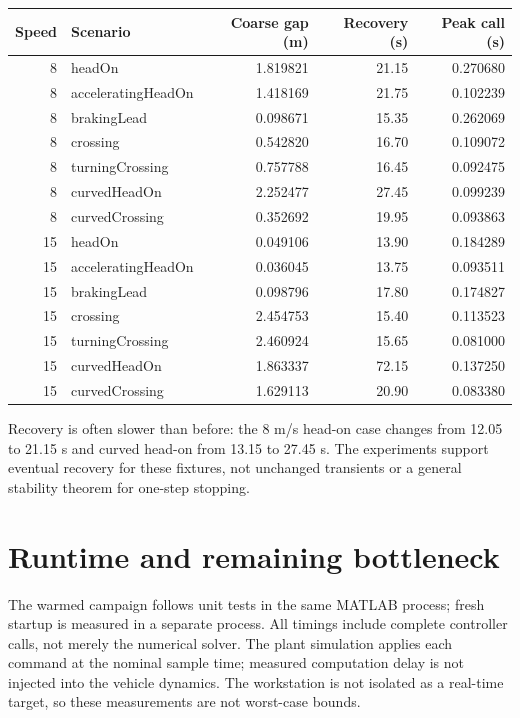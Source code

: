 \documentclass[11pt]{article}
\begin{document}
\begin{center}\small\begin{tabular}{rlrrr}\toprule
Speed & Scenario & Coarse gap (m) & Recovery (s) & Peak call (s)\\\midrule
8 & headOn & 1.819821 & 21.15 & 0.270680\\
8 & acceleratingHeadOn & 1.418169 & 21.75 & 0.102239\\
8 & brakingLead & 0.098671 & 15.35 & 0.262069\\
8 & crossing & 0.542820 & 16.70 & 0.109072\\
8 & turningCrossing & 0.757788 & 16.45 & 0.092475\\
8 & curvedHeadOn & 2.252477 & 27.45 & 0.099239\\
8 & curvedCrossing & 0.352692 & 19.95 & 0.093863\\
15 & headOn & 0.049106 & 13.90 & 0.184289\\
15 & acceleratingHeadOn & 0.036045 & 13.75 & 0.093511\\
15 & brakingLead & 0.098796 & 17.80 & 0.174827\\
15 & crossing & 2.454753 & 15.40 & 0.113523\\
15 & turningCrossing & 2.460924 & 15.65 & 0.081000\\
15 & curvedHeadOn & 1.863337 & 72.15 & 0.137250\\
15 & curvedCrossing & 1.629113 & 20.90 & 0.083380\\
\bottomrule\end{tabular}\end{center}
Recovery is often slower than before: the 8 m/s head-on case changes from
12.05 to 21.15 s and curved head-on from 13.15 to 27.45 s. The experiments
support eventual recovery for these fixtures, not unchanged transients or a
general stability theorem for one-step stopping.

\section{Runtime and remaining bottleneck}
The warmed campaign follows unit tests in the same MATLAB process; fresh
startup is measured in a separate process. All timings include complete
controller calls, not merely the numerical solver. The plant simulation
applies each command at the nominal sample time; measured computation delay
is not injected into the vehicle dynamics. The workstation is not isolated
as a real-time target, so these measurements are not worst-case bounds.
\end{document}
